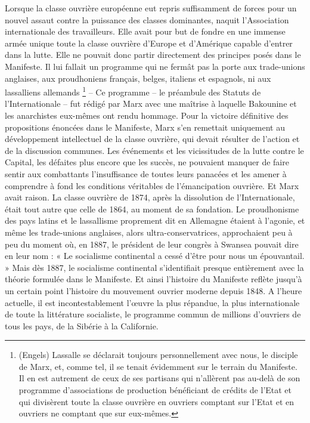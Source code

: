 \documentclass[french,twoside]{book} %
\begin{document}
Lorsque la classe ouvrière européenne eut repris suffisamment de forces pour un nouvel assaut contre la puissance des classes dominantes, naquit l’Association internationale des travailleurs. Elle avait pour but de fondre en une immense armée unique toute la classe ouvrière d’Europe et d’Amérique capable d’entrer dans la lutte. Elle ne pouvait donc partir directement des principes posés dans le Manifeste. Il lui fallait un programme qui ne fermât pas la porte aux trade-unions anglaises, aux proudhoniens français, belges, italiens et espagnols, ni aux lassalliens allemands \footnote{(Engels) Lassalle se déclarait toujours personnellement avec nous, le disciple de Marx, et, comme tel, il se tenait évidemment sur le terrain du Manifeste. Il en est autrement de ceux de ses partisans qui n’allèrent pas au-delà de son programme d’associations de production bénéficiant de crédits de l’Etat et qui divisèrent toute la classe ouvrière en ouvriers comptant sur l’Etat et en ouvriers ne comptant que sur eux-mêmes.} – Ce programme – le préambule des Statuts de l’Internationale – fut rédigé par Marx avec une maîtrise à laquelle Bakounine et les anarchistes eux-mêmes ont rendu hommage. Pour la victoire définitive des propositions énoncées dans le Manifeste, Marx s’en remettait uniquement au développement intellectuel de la classe ouvrière, qui devait résulter de l’action et de la discussion communes. Les événements et les vicissitudes de la lutte contre le Capital, les défaites plus encore que les succès, ne pouvaient manquer de faire sentir aux combattants l’insuffisance de toutes leurs panacées et les amener à comprendre à fond les conditions véritables de l’émancipation ouvrière. Et Marx avait raison. La classe ouvrière de 1874, après la dissolution de l’Internationale, était tout autre que celle de 1864, au moment de sa fondation. Le proudhonisme des pays latins et le lassallisme proprement dit en Allemagne étaient à l’agonie, et même les trade-unions anglaises, alors ultra-conservatrices, approchaient peu à peu du moment où, en 1887, le président de leur congrès à Swansea pouvait dire en leur nom : « Le socialisme continental a cessé d’être pour nous un épouvantail. » Mais dès 1887, le socialisme continental s’identifiait presque entièrement avec la théorie formulée dans le Manifeste. Et ainsi l’histoire du Manifeste reflète jusqu’à un certain point l’histoire du mouvement ouvrier moderne depuis 1848. A l’heure actuelle, il est incontestablement l’œuvre la plus répandue, la plus internationale de toute la littérature socialiste, le programme commun de millions d’ouvriers de tous les pays, de la Sibérie à la Californie.\par
\end{document}
